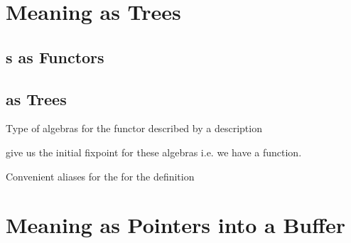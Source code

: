 \documentclass{article}
\begin{document}
\section{Meaning as Trees}

\subsection{s as Functors}


\subsection{ as Trees}

Type of algebras for the functor described by a  description




 give us the initial fixpoint for these algebras i.e.
we have a  function.



Convenient aliases for the for the  definition



\section{Meaning as Pointers into a Buffer}
\end{document}
